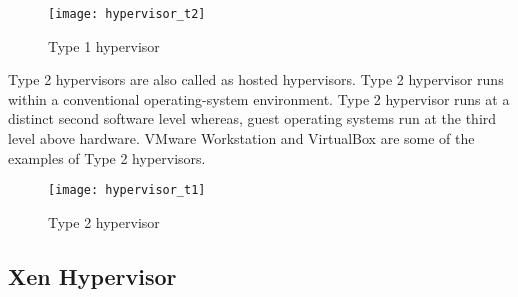 \begin{figure}[!ht]
\centering
\texttt{[image: hypervisor\_t2]}
\caption{Type 1 hypervisor}
\label{Type 1 hypervisor}
\end{figure}
\begin{description}
\item Type 2 hypervisors are also called as hosted hypervisors. Type 2 hypervisor runs within a conventional operating-system environment. Type 2 hypervisor runs at a distinct second software level whereas, guest operating systems run at the third level above hardware. VMware Workstation and VirtualBox are some of the examples of Type 2 hypervisors.\cite{Sugerman:2001:VID:647055.715774, citeulike:3149886}
\end{description}
\begin{figure}[!ht]
\centering
\texttt{[image: hypervisor\_t1]}
\caption{Type 2 hypervisor}
\label{Type 2 hypervisor}
\end{figure}

\subsection{Xen Hypervisor}

